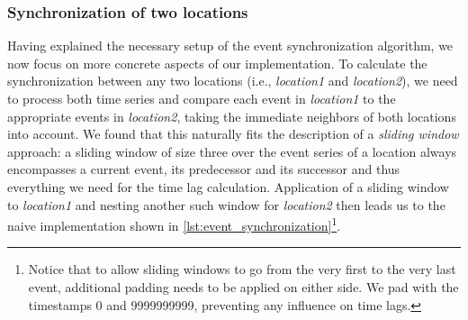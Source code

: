 \subsubsection{Synchronization of two locations}
Having explained the necessary setup of the event synchronization algorithm, we now focus on more concrete aspects of our implementation. To calculate the synchronization between any two locations (i.e., \textit{location1} and \textit{location2}), we need to process both time series and compare each event in \textit{location1} to the appropriate events in \textit{location2}, taking the immediate neighbors of both locations into account. We found that this naturally fits the description of a \textit{sliding window} approach: a sliding window of size three over the event series of a location always encompasses a current event, its predecessor and its successor and thus everything we need for the time lag calculation. Application of a sliding window to \textit{location1} and nesting another such window for \textit{location2} then leads us to the naive implementation shown in \cref{lst:event_synchronization}\footnote{Notice that to allow sliding windows to go from the very first to the very last event, additional padding needs to be applied on either side. We pad with the timestamps 0 and 9999999999, preventing any influence on time lags.}.

